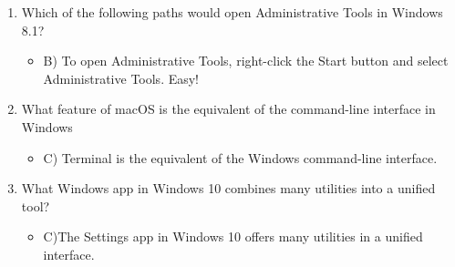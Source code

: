 \documentclass{article}
\begin{document}
\begin{enumerate}
\begin{itemize}
    \end{itemize}
    \item Which of the following paths would open Administrative Tools in
Windows 8.1?
    \begin{itemize}
        \item B) To open Administrative Tools, right-click the Start button and
select Administrative Tools. Easy!
    \end{itemize}
    \item What feature of macOS is the equivalent of the command-line
interface in Windows
    \begin{itemize}
        \item C) Terminal is the equivalent of the Windows command-line
interface.
    \end{itemize}
    \item What Windows app in Windows 10 combines many utilities into a
unified tool?
    \begin{itemize}
        \item C)The Settings app in Windows 10 offers many utilities in a unified
interface.
    \end{itemize}

\end{enumerate}
\end{document}
